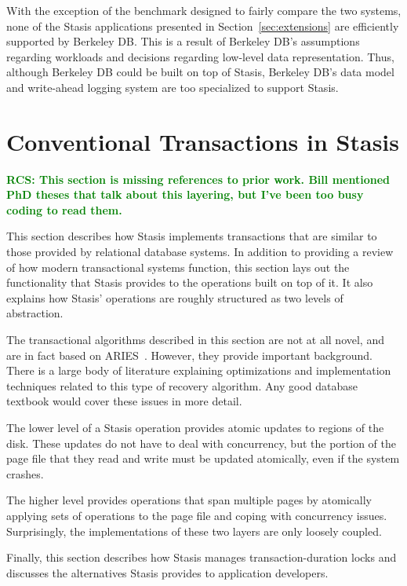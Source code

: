 \documentclass[letterpaper,twocolumn,10pt]{article}
\newcommand{\yad}{Stasis\xspace}
\newcommand{\yads}{Stasis'\xspace}
\newcommand{\rcs}[1]{\textcolor{green}{\bf RCS: #1}}
\begin{document}
With the exception of the benchmark designed to fairly compare the two
systems, none of the \yad applications presented in
Section~\ref{sec:extensions} are efficiently supported by Berkeley DB.
This is a result of Berkeley DB's assumptions regarding workloads and
decisions regarding low-level data representation.  Thus, although
Berkeley DB could be built on top of \yad, Berkeley DB's data model
and write-ahead logging system are too specialized to support \yad.




\section{Conventional Transactions in \yad}

\rcs{This section is missing references to prior work.  Bill mentioned
PhD theses that talk about this layering, but I've been too busy
coding to read them.}

This section describes how \yad implements transactions that are
similar to those provided by relational database systems.  In addition
to providing a review of how modern transactional systems function,
this section lays out the functionality that \yad provides to the
operations built on top of it.  It also explains how \yads
operations are roughly structured as two levels of abstraction.  

The transactional algorithms described in this section are not at all
novel, and are in fact based on ARIES~\cite{aries}.  However, they
provide important background.  There is a large body of literature
explaining optimizations and implementation techniques related to this
type of recovery algorithm.  Any good database textbook would cover these
issues in more detail.

The lower level of a \yad operation provides atomic
updates to regions of the disk.  These updates do not have to deal
with concurrency, but the portion of the page file that they read and
write must be updated atomically, even if the system crashes.

The higher level provides operations that span multiple pages by
atomically applying sets of operations to the page file and coping
with concurrency issues.  Surprisingly, the implementations of these
two layers are only loosely coupled.

Finally, this section describes how \yad manages transaction-duration
locks and discusses the alternatives \yad provides to application developers.
\end{document}
